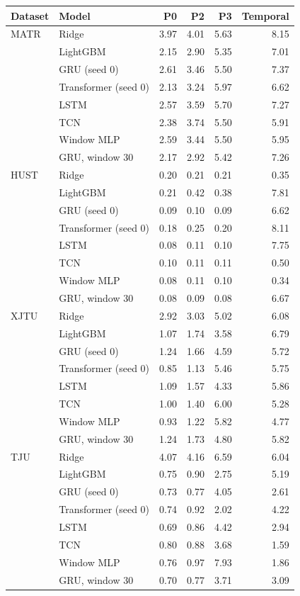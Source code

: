 \begin{tabular}{llrrrr}
\toprule
Dataset & Model & P0 & P2 & P3 & Temporal \\
\midrule
MATR & Ridge & 3.97 & 4.01 & 5.63 & 8.15 \\
 & LightGBM & 2.15 & 2.90 & 5.35 & 7.01 \\
 & GRU (seed 0) & 2.61 & 3.46 & 5.50 & 7.37 \\
 & Transformer (seed 0) & 2.13 & 3.24 & 5.97 & 6.62 \\
 & LSTM & 2.57 & 3.59 & 5.70 & 7.27 \\
 & TCN & 2.38 & 3.74 & 5.50 & 5.91 \\
 & Window MLP & 2.59 & 3.44 & 5.50 & 5.95 \\
 & GRU, window 30 & 2.17 & 2.92 & 5.42 & 7.26 \\
HUST & Ridge & 0.20 & 0.21 & 0.21 & 0.35 \\
 & LightGBM & 0.21 & 0.42 & 0.38 & 7.81 \\
 & GRU (seed 0) & 0.09 & 0.10 & 0.09 & 6.62 \\
 & Transformer (seed 0) & 0.18 & 0.25 & 0.20 & 8.11 \\
 & LSTM & 0.08 & 0.11 & 0.10 & 7.75 \\
 & TCN & 0.10 & 0.11 & 0.11 & 0.50 \\
 & Window MLP & 0.08 & 0.11 & 0.10 & 0.34 \\
 & GRU, window 30 & 0.08 & 0.09 & 0.08 & 6.67 \\
XJTU & Ridge & 2.92 & 3.03 & 5.02 & 6.08 \\
 & LightGBM & 1.07 & 1.74 & 3.58 & 6.79 \\
 & GRU (seed 0) & 1.24 & 1.66 & 4.59 & 5.72 \\
 & Transformer (seed 0) & 0.85 & 1.13 & 5.46 & 5.75 \\
 & LSTM & 1.09 & 1.57 & 4.33 & 5.86 \\
 & TCN & 1.00 & 1.40 & 6.00 & 5.28 \\
 & Window MLP & 0.93 & 1.22 & 5.82 & 4.77 \\
 & GRU, window 30 & 1.24 & 1.73 & 4.80 & 5.82 \\
TJU & Ridge & 4.07 & 4.16 & 6.59 & 6.04 \\
 & LightGBM & 0.75 & 0.90 & 2.75 & 5.19 \\
 & GRU (seed 0) & 0.73 & 0.77 & 4.05 & 2.61 \\
 & Transformer (seed 0) & 0.74 & 0.92 & 2.02 & 4.22 \\
 & LSTM & 0.69 & 0.86 & 4.42 & 2.94 \\
 & TCN & 0.80 & 0.88 & 3.68 & 1.59 \\
 & Window MLP & 0.76 & 0.97 & 7.93 & 1.86 \\
 & GRU, window 30 & 0.70 & 0.77 & 3.71 & 3.09 \\
\bottomrule
\end{tabular}
